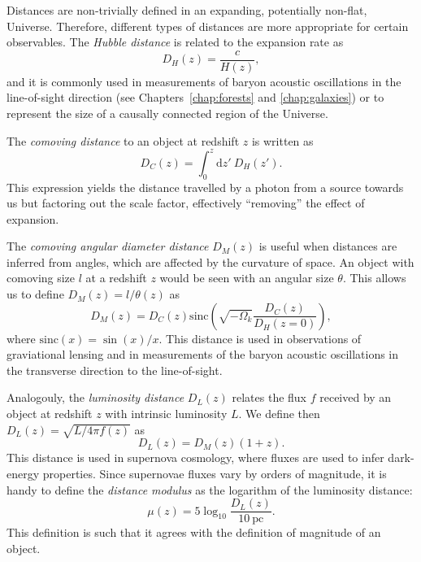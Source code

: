     Distances are non-trivially defined in an expanding, potentially non-flat, Universe. 
    Therefore, different types of distances are more appropriate for certain observables.
    The \emph{Hubble distance} is related to the expansion rate as 
    \begin{equation}
        D_H(z) = \frac{c}{H(z)},
        \label{eq:hubble_distance}
    \end{equation}
    and it is commonly used in measurements of baryon acoustic oscillations in the line-of-sight 
    direction (see Chapters~\ref{chap:forests} and \ref{chap:galaxies}) or to represent the
    size of a causally connected region of the Universe. 
    
    The \emph{comoving distance} to 
    an object at redshift $z$ is written as
    \begin{equation}
        D_C(z)  = \int_0^z \mathrm{d}z' ~ D_H(z').
        \label{eq:comoving_distance}
    \end{equation} 
    This expression yields the distance travelled by a photon from a source towards us but 
    factoring out the scale factor, effectively ``removing'' the effect of expansion. 
    
    The \emph{comoving angular diameter distance} $D_M(z)$ is useful when distances are inferred from 
    angles, which are affected by the curvature of space. 
    An object with comoving size $l$ at a redshift $z$ would be seen with an angular size $\theta$.
    This allows us to define $D_M(z) = l/\theta(z)$ as
    \begin{equation}
        D_M(z)  = D_C(z) \mathrm{sinc} \left(\sqrt{-\Omega_k} \frac{D_C(z)}{D_H(z=0)}\right),
        \label{eq:comoving_ang_diameter_distance}
    \end{equation}
    where $\mathrm{sinc}(x) = \sin(x)/x$. This distance is used in observations of 
    graviational lensing and in measurements of the baryon acoustic oscillations 
    in the transverse direction to the line-of-sight. 
    
    Analogouly, the \emph{luminosity distance} $D_L(z)$ 
    relates the flux $f$ received by an object at redshift $z$ with intrinsic luminosity $L$.
    We define then $D_L(z) = \sqrt{L/4\pi f(z)}$ as
    \begin{equation}
        D_L(z)  = D_M(z) (1+z).
        \label{eq:luminosity_distance}
    \end{equation}
    This distance is used in supernova cosmology, where fluxes are used to infer 
    dark-energy properties. Since supernovae fluxes vary by orders of magnitude, 
    it is handy to define the \emph{distance modulus} as the logarithm of the 
    luminosity distance:
    \begin{equation}
        \mu(z) = 5\log_{10}\frac{D_L(z)}{10~\mathrm{pc}}.
        \label{eq:distance_modulus}
    \end{equation}
    This definition is such that it agrees with the definition of magnitude of an object.

